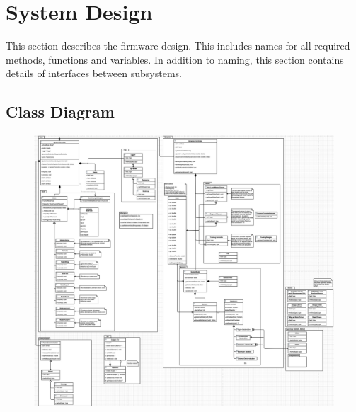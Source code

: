 \section{System Design}
This section describes the firmware design. This includes names for all required methods, functions and variables. In addition to naming, this section contains details of interfaces between subsystems.

\subsection{Class Diagram}

\begin{figure}[h!]
\centering
\includegraphics[scale=0.26]{./images/class_diagram}
\end{figure}